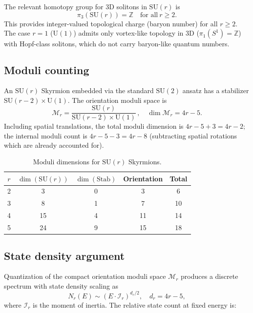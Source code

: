 ﻿\documentclass[a4paper,12pt]{article}
\begin{document}
The relevant homotopy group for 3D solitons in $\mathrm{SU}(r)$ is
\begin{equation}
  \pi_3(\mathrm{SU}(r)) = \mathbb{Z} \quad\text{for all}~r\geq 2.
\end{equation}
This provides integer-valued topological charge (baryon number) for all
$r\geq 2$.  The case $r=1$ ($\mathrm{U}(1)$) admits only vortex-like
topology in 3D ($\pi_1(S^1)=\mathbb{Z}$) with Hopf-class solitons,
which do not carry baryon-like quantum numbers.

\subsection{Moduli counting}

An $\mathrm{SU}(r)$ Skyrmion embedded via the standard $\mathrm{SU}(2)$
ansatz has a stabilizer $\mathrm{SU}(r-2)\times\mathrm{U}(1)$.  The
orientation moduli space is
\begin{equation}
  \mathcal{M}_r = \frac{\mathrm{SU}(r)}{\mathrm{SU}(r-2)\times\mathrm{U}(1)}\,,
  \quad\dim\mathcal{M}_r = 4r-5.
\end{equation}
Including spatial translations, the total moduli dimension is
$4r-5+3=4r-2$; the internal moduli count is $4r-5-3=4r-8$
(subtracting spatial rotations which are already accounted for).

\begin{table}[t]
\centering
\caption{Moduli dimensions for $\mathrm{SU}(r)$ Skyrmions.}
\label{tab:moduli}

\begin{tabular}{ccccc}
$r$ & $\dim(\mathrm{SU}(r))$ & $\dim(\text{Stab})$ & Orientation & Total \\
\hline
2 & 3  & 0 & 3  & 6  \\
3 & 8  & 1 & 7  & 10 \\
4 & 15 & 4 & 11 & 14 \\
5 & 24 & 9 & 15 & 18 \\
\end{tabular}

\end{table}

\subsection{State density argument}
\label{sec:statedensity}

Quantization of the compact orientation moduli space
$\mathcal{M}_r$ produces a discrete spectrum with state density
scaling as
\begin{equation}
  N_r(E) \sim (E\cdot\mathcal{I}_r)^{d_r/2},
  \quad d_r = 4r-5,
\end{equation}
where $\mathcal{I}_r$ is the moment of inertia.  The relative state
count at fixed energy is:
\end{document}
